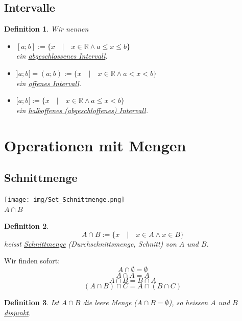 \documentclass{report}
\newtheorem{mydef}{Definition}
\begin{document}
\subsection{Intervalle}
\begin{mydef}Wir nennen\begin{itemize}
\item $[a;b] := \{x \quad | \quad x \in \mathbb{R} \land a \leq x \leq b\}$\\
ein \underline{abgeschlossenes Intervall}.
\item $]a;b[ = (a;b) := \{x \quad | \quad x \in \mathbb{R} \land a < x < b\}$\\
ein \underline{offenes Intervall}.
\item $[a;b[ := \{x \quad | \quad x \in \mathbb{R} \land a \leq x < b\}$\\
ein \underline{halboffenes (abgeschloffenes) Intervall}.\end{itemize}\end{mydef}

\section{Operationen mit Mengen}
\subsection{Schnittmenge}
\begin{center}\texttt{[image: img/Set\_Schnittmenge.png]}\\$A \cap B$\end{center}
\begin{mydef}\begin{equation}A \cap B := \{x \quad | \quad x \in A \land x \in B \}\end{equation}
heisst \underline{Schnittmenge} (Durchschnittsmenge, Schnitt) von $A$ und $B$.\end{mydef}
Wir finden sofort:
\begin{equation}A \cap \emptyset = \emptyset\end{equation}
\begin{equation}A \cap A = A\end{equation}
\begin{equation}A \cap B = B \cap A\end{equation}
\begin{equation}(A \cap B) \cap C = A \cap (B \cap C)\end{equation}
\begin{mydef}Ist $A \cap B$ die leere Menge ($A \cap B = \emptyset$), so heissen $A$ und $B$ \underline{disjunkt}.\end{mydef}
\end{document}
